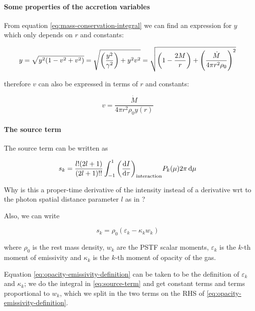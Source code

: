 \documentclass[main.tex]{subfiles}
\begin{document}
\paragraph{Some properties of the accretion variables}

From equation \eqref{eq:mass-conservation-integral} we can find an expression \cite[eq. 18a]{ThorneFLammmangZytkow:1981feb} for \(y\) which only depends on \(r\) and constants:

\begin{equation}
  y = \sqrt{y^2 \qty(1 - v^2 + v^2)}
  = \sqrt{\qty(\frac{y^2}{\gamma^2}) + y^2 v^2}
  = \sqrt{\qty(1 - \frac{2M}{r}) + \qty(\frac{\dot{M}}{4 \pi r^2 \rho_0})^2}
\end{equation}

therefore \(v\) can also be expressed in terms of \(r\) and constants:

\begin{equation}
  v = \frac{\dot M}{4 \pi r^2 \rho_0 y(r)}
\end{equation}

\paragraph{The source term}

The source term can be written \cite[eq. 15]{ThorneFLammmangZytkow:1981feb} as

\begin{equation} \label{eq:source-term}
  s_k = \frac{l! (2l+1)}{(2l+1)!!} \int_{-1}^1 \qty(\dv{I}{\tau})_{\text{interaction}} P_k(\mu) 2 \pi \dd{\mu}
\end{equation}

\begin{greenbox}
  Why is this a proper-time derivative of the intensity instead of a derivative wrt to the photon spatial distance parameter \(l\) as in \cite[]{Thorne:1981feb}?
\end{greenbox}

Also, we can write

\begin{equation} \label{eq:opacity-emissivity-definition}
  s_k = \rho_0 (\varepsilon_k - \kappa_k w_k)
\end{equation}

where \(\rho_0\) is the rest mass density, \(w_k\) are the PSTF scalar moments, \(\varepsilon_k\) is the \(k\)-th moment of emissivity and \(\kappa_k\) is the \(k\)-th moment of opacity of the gas.

Equation \eqref{eq:opacity-emissivity-definition} can be taken to be the definition of \(\varepsilon_k\) and \(\kappa_k\); we do the integral in \eqref{eq:source-term} and get constant terms and terms proportional to \(w_k\), which we split in the two terms on the RHS of \eqref{eq:opacity-emissivity-definition}.
\end{document}
